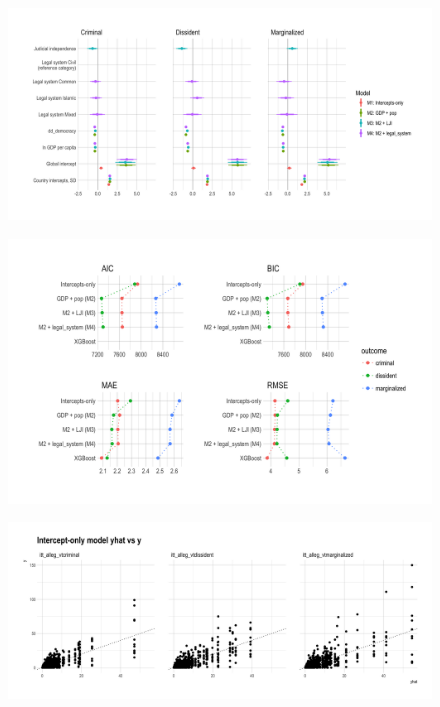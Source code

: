 \documentclass[12pt]{article}
\begin{document}
\begin{figure}
\begin{center}
\caption{}
\includegraphics[width=.99\textwidth]{../output/count-model-coefs.png}
\end{center}
\end{figure}

\begin{figure}
\begin{center}
\caption{}
\includegraphics[width=.99\textwidth]{../output/model-fit-plot.png}
\end{center}
\end{figure}

\begin{figure}
\begin{center}
\caption{}
\includegraphics[width=.99\textwidth]{../output/mdl1-y-vs-yhat.png}
\end{center}
\end{figure}
\end{document}
